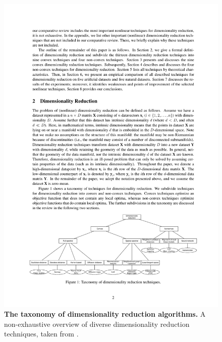 \begin{figure}[!ht]
\begin{center}
\includegraphics[width=\textwidth]{network/fig/dimension_reduction.pdf}
\end{center}
\caption[Dimensionality reduction algorithms]{
{\bf The taxonomy of dimensionality reduction algorithms.}
A non-exhaustive overview of diverse dimensionality reduction
techniques, taken from \cite{Maaten2009}.
}
\label{fig:dimension_reduction}
\end{figure}

